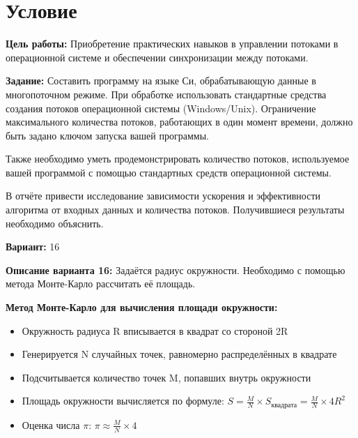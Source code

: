 \section{Условие}
{\bfseries Цель работы:}
Приобретение практических навыков в управлении потоками в операционной системе и обеспечении синхронизации между потоками.

{\bfseries Задание:}
Составить программу на языке Си, обрабатывающую данные в многопоточном режиме. При обработке использовать стандартные средства создания потоков операционной системы (Windows/Unix). Ограничение максимального количества потоков, работающих в один момент времени, должно быть задано ключом запуска вашей программы.

Также необходимо уметь продемонстрировать количество потоков, используемое вашей программой с помощью стандартных средств операционной системы.

В отчёте привести исследование зависимости ускорения и эффективности алгоритма от входных данных и количества потоков. Получившиеся результаты необходимо объяснить.

{\bfseries Вариант:} 16

{\bfseries Описание варианта 16:}
Задаётся радиус окружности. Необходимо с помощью метода Монте-Карло рассчитать её площадь.

{\bfseries Метод Монте-Карло для вычисления площади окружности:}
\begin{itemize}
    \item Окружность радиуса R вписывается в квадрат со стороной 2R
    \item Генерируется N случайных точек, равномерно распределённых в квадрате
    \item Подсчитывается количество точек M, попавших внутрь окружности
    \item Площадь окружности вычисляется по формуле: $S = \frac{M}{N} \times S_{квадрата} = \frac{M}{N} \times 4R^2$
    \item Оценка числа $\pi$: $\pi \approx \frac{M}{N} \times 4$
\end{itemize}
